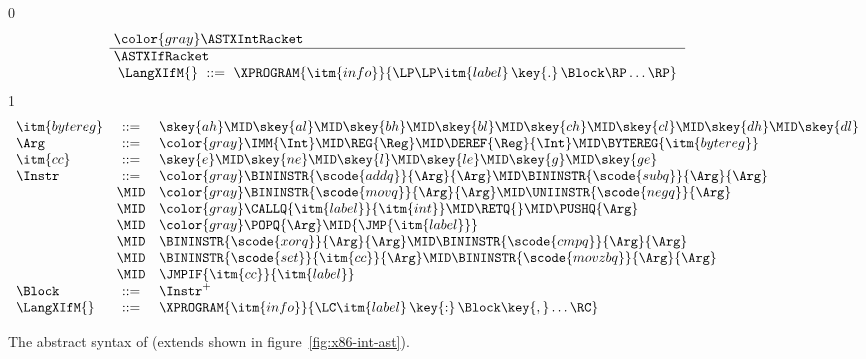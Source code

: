 \documentclass[7x10]{TimesAPriori_MIT}%
\newcommand{\gray}[1]{{\color{gray} #1}}
\def\racketEd{0}
\def\pythonEd{1}
\def\edition{0}
\newcommand{\racket}[1]{{\if\edition\racketEd{#1}\fi}}
\newcommand{\python}[1]{{\if\edition\pythonEd #1\fi}}
\numberwithin{theorem}{chapter}
\numberwithin{definition}{chapter}
\numberwithin{equation}{chapter}
\begin{document}
\begin{figure}[tp]
\begin{tcolorbox}[colback=white]
\small    
{\if\edition\racketEd    
\[\arraycolsep=3pt
\begin{array}{l}
  \gray{\ASTXIntRacket} \\ \hline
  \ASTXIfRacket \\
\begin{array}{lcl}
\LangXIfM{} &::= & \XPROGRAM{\itm{info}}{\LP\LP\itm{label} \,\key{.}\, \Block \RP\ldots\RP}
\end{array}
\end{array}
\]
\fi}
%
{\if\edition\pythonEd
\[
\begin{array}{lcl}
\itm{bytereg} &::=& \skey{ah} \MID \skey{al} \MID \skey{bh} \MID \skey{bl}
    \MID \skey{ch} \MID \skey{cl} \MID \skey{dh} \MID \skey{dl} \\
\Arg &::=&  \gray{\IMM{\Int} \MID \REG{\Reg} \MID \DEREF{\Reg}{\Int}} 
     \MID \BYTEREG{\itm{bytereg}} \\
\itm{cc} & ::= & \skey{e} \MID \skey{ne} \MID \skey{l} \MID \skey{le} \MID \skey{g} \MID \skey{ge} \\
\Instr &::=& \gray{ \BININSTR{\scode{addq}}{\Arg}{\Arg} 
       \MID \BININSTR{\scode{subq}}{\Arg}{\Arg} } \\
       &\MID& \gray{ \BININSTR{\scode{movq}}{\Arg}{\Arg} 
       \MID \UNIINSTR{\scode{negq}}{\Arg} } \\
       &\MID& \gray{ \CALLQ{\itm{label}}{\itm{int}} \MID \RETQ{} 
       \MID \PUSHQ{\Arg}} \\
       &\MID& \gray{ \POPQ{\Arg} \MID \racket{\JMP{\itm{label}}} } \python{\JMP{\itm{label}}}\\
       &\MID& \BININSTR{\scode{xorq}}{\Arg}{\Arg}
       \MID \BININSTR{\scode{cmpq}}{\Arg}{\Arg}\\
       &\MID& \BININSTR{\scode{set}}{\itm{cc}}{\Arg} 
       \MID \BININSTR{\scode{movzbq}}{\Arg}{\Arg}\\
       &\MID&  \JMPIF{\itm{cc}}{\itm{label}} \\
\Block &::= & \Instr^{+} \\
\LangXIfM{} &::= & \XPROGRAM{\itm{info}}{\LC\itm{label} \,\key{:}\, \Block \key{,} \ldots \RC }
\end{array}
\]
\fi}
\end{tcolorbox}
\caption{The abstract syntax of \LangXIf{} (extends \LangXInt{} shown in figure~\ref{fig:x86-int-ast}).}
\label{fig:x86-1}
\end{figure}
\end{document}
